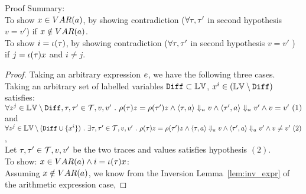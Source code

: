 Proof Summary: 
\\
To show $x \in VAR(a)$, by showing contradiction ($\forall \mathtt{\tau}, \mathtt{\tau}'$ in second hypothesis  $v = v'$)
 if $x \notin VAR(a)$.
 \\
To show $i = \iota(\mathtt{\tau})$, by showing contradiction ($\forall \mathtt{\tau}, \mathtt{\tau}'$ in second hypothesis  $v = v'$ ) 
if $j = \iota(\mathtt{\tau}) x$ and $i \neq j$.
\begin{proof}
	Taking an arbitrary expression $e$,
	 we have the following three cases.
Taking an arbitrary set of labelled variables 
	$\mathtt{Diff} \subset \mathbb{LV}$, $x^i \in (\mathbb{LV} \setminus \mathtt{Diff})$ satisfies:
	\\
	$\forall z^j \in \mathbb{LV} \setminus \mathtt{Diff}, \mathtt{\tau}, \mathtt{\tau}' \in \mathcal{T}, v, v' ~.~  
	\rho(\mathtt{\tau}) z = \rho(\mathtt{\tau}') z \land 
	\langle \mathtt{\tau}, a \rangle \Downarrow_a v \land \langle \mathtt{\tau}', a \rangle \Downarrow_a v' \land v = v' ~ (1)
	$
	\\
	and 
	$\forall z^j \in \mathbb{LV} \setminus (\mathtt{Diff} \cup \{x^i\} ) ~.~  
	\exists \mathtt{\tau}, \mathtt{\tau}' \in \mathcal{T}, v, v' ~.~  
	\rho(\mathtt{\tau}) z = \rho(\mathtt{\tau}') z \land 
	\langle \mathtt{\tau}, a \rangle \Downarrow_a v \land \langle \mathtt{\tau}', a \rangle \Downarrow_a v' \land v \neq v' ~ (2) 
	$,
	\\
	Let $\mathtt{\tau}, \mathtt{\tau}' \in \mathcal{T}, v, v'$ be the two traces and values satisfies hypothesis $(2)$.
	\\
	To show: $x \in VAR(a) \land i = \iota(\mathtt{\tau}) x$:
	\\
Assuming $x \notin VAR(a)$, we know from the Inversion Lemma~\ref{lem:inv_expr} of the arithmetic expression case,

\end{proof}
